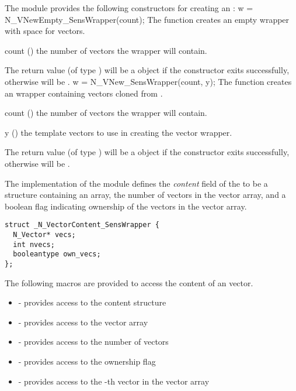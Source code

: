 The {\nvecwrap} module provides the following constructors for creating an
{\nvecwrap}:
{
  w = N\_VNewEmpty\_SensWrapper(count);
}
{
  The function  creates an empty {\nvecwrap}
  wrapper with space for  vectors.
}
{
  \begin{args}[count]
  \item[count] ()
    the number of vectors the wrapper will contain.
  \end{args}
}
{
  The return value  (of type ) will be a {\nvector} object
  if the constructor exits successfully, otherwise  will be .
}
{}
%
{
  w = N\_VNew\_SensWrapper(count, y);
}
{
  The function  creates an {\nvecwrap}
  wrapper containing  vectors cloned from .
}
{
  \begin{args}[count]
  \item[count] ()
    the number of vectors the wrapper will contain.
  \item[y] ()
    the template vectors to use in creating the vector wrapper.
  \end{args}
}
{
  The return value  (of type ) will be a {\nvector} object
  if the constructor exits successfully, otherwise  will be .
}
{}

The {\nvecwrap} implementation of the {\nvector} module defines
the \textit{content} field of the  to be a structure containing
an  array, the number of vectors in the vector array, and a
boolean flag indicating ownership of the vectors in the vector array.
%
\begin{verbatim} 
struct _N_VectorContent_SensWrapper {
  N_Vector* vecs;
  int nvecs;
  booleantype own_vecs;
};
\end{verbatim}
%
The following macros are provided to access the content of an {\nvecwrap}
vector.
\begin{itemize}
 \item {}   - provides access to the content structure
 \item {}      - provides access to the vector array
 \item {}     - provides access to the number of vectors
 \item {} - provides access to the ownership flag
 \item {}     - provides access to the -th vector in
 the  vector array
\end{itemize}

